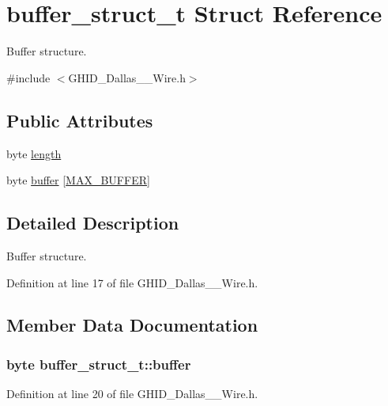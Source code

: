 \hypertarget{structbuffer__struct__t}{\section{buffer\-\_\-struct\-\_\-t \-Struct \-Reference}
\label{structbuffer__struct__t}
}


\-Buffer structure.  




{\ttfamily \#include $<$\-G\-H\-I\-D\-\_\-\-Dallas\-\_\-\_\-\-Wire.\-h$>$}

\subsection*{\-Public \-Attributes}
\begin{DoxyCompactItemize}
\item 
byte \hyperlink{structbuffer__struct__t_a812251f18d1b5b93fed46984ed8d7cf1}{length}
\item 
byte \hyperlink{structbuffer__struct__t_a35fecf6dc4e1c70f708188215c85bdfc}{buffer} \mbox{[}\hyperlink{_g_h_i_d___s_p_i_8h_a1d5dab30b404fab91608086105afc78c}{\-M\-A\-X\-\_\-\-B\-U\-F\-F\-E\-R}\mbox{]}
\end{DoxyCompactItemize}


\subsection{\-Detailed \-Description}
\-Buffer structure. 

\-Definition at line 17 of file \-G\-H\-I\-D\-\_\-\-Dallas\-\_\-\_\-\-Wire.\-h.



\subsection{\-Member \-Data \-Documentation}
\hypertarget{structbuffer__struct__t_a35fecf6dc4e1c70f708188215c85bdfc}{
\subsubsection[{buffer}]{\setlength{\rightskip}{0pt plus 5cm}byte {\bf buffer\-\_\-struct\-\_\-t\-::buffer}}}\label{structbuffer__struct__t_a35fecf6dc4e1c70f708188215c85bdfc}


\-Definition at line 20 of file \-G\-H\-I\-D\-\_\-\-Dallas\-\_\-\_\-\-Wire.\-h.

